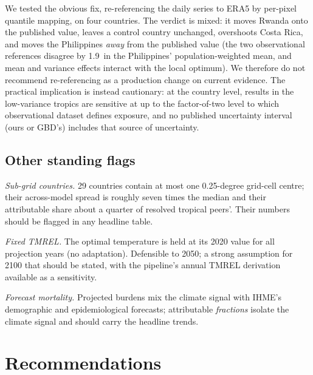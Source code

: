 \documentclass[11pt]{ozreport}
\begin{document}
We tested the obvious fix, re-referencing the daily series to ERA5 by
per-pixel quantile mapping, on four countries. The verdict is mixed: it
moves Rwanda onto the published value, leaves a control country unchanged,
overshoots Costa Rica, and moves the Philippines \emph{away} from the
published value (the two observational references disagree by
1.9\,\textcelsius{} in the Philippines' population-weighted mean, and mean
and variance effects interact with the local optimum). We therefore do not
recommend re-referencing as a production change on current evidence. The
practical implication is instead cautionary: at the country level, results
in the low-variance tropics are sensitive at up to the factor-of-two level
to which observational dataset defines exposure, and no published
uncertainty interval (ours or GBD's) includes that source of uncertainty.

\subsection{Other standing flags}

\emph{Sub-grid countries.} 29 countries contain at most one 0.25-degree
grid-cell centre; their across-model spread is roughly seven times the
median and their attributable share about a quarter of resolved tropical
peers'. Their numbers should be flagged in any headline table.

\emph{Fixed TMREL.} The optimal temperature is held at its 2020 value for
all projection years (no adaptation). Defensible to 2050; a strong
assumption for 2100 that should be stated, with the pipeline's annual
TMREL derivation available as a sensitivity.

\emph{Forecast mortality.} Projected burdens mix the climate signal with
IHME's demographic and epidemiological forecasts; attributable
\emph{fractions} isolate the climate signal and should carry the headline
trends.

\section{Recommendations}\label{sec:rec}
\end{document}
